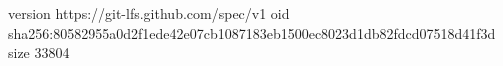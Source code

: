 version https://git-lfs.github.com/spec/v1
oid sha256:80582955a0d2f1ede42e07cb1087183eb1500ec8023d1db82fdcd07518d41f3d
size 33804
